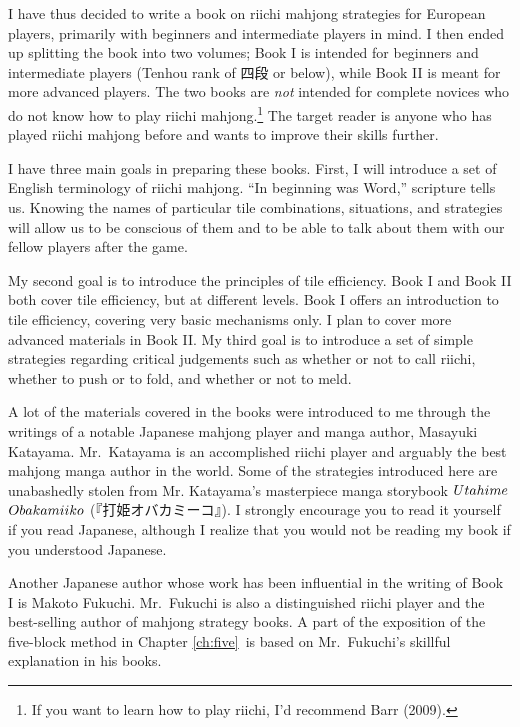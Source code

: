 \bigskip
I have thus decided to write a book on riichi mahjong strategies for European players, primarily with beginners and intermediate players in mind. I then ended up splitting the book into two volumes; Book I is intended for beginners and intermediate players ({\jap Tenhou} rank of 四段 or below), while Book II is meant for more advanced players. The two books are \emph{not} intended for complete novices who do not know how to play riichi mahjong.\footnote{If you want to learn how to play riichi, I'd recommend Barr (2009).} The target reader is anyone who has played riichi mahjong before and wants to improve their skills further. 

\bigskip
I have three main goals in preparing these books. First, I will introduce a set of English terminology of riichi mahjong. 
``In beginning was Word,'' scripture tells us. Knowing the names of particular tile combinations, situations, and strategies will allow us to be conscious of them and to be able to talk about them with our fellow players after the game. 

\bigskip
My second goal is to introduce the principles of tile efficiency. 
Book I and Book II both cover tile efficiency, but at different levels. Book I offers an introduction to tile efficiency, covering very basic mechanisms only. I plan to cover more advanced materials in Book II. 
My third goal is to introduce a set of simple strategies regarding critical judgements such as whether or not to call {\jap riichi}, whether to push or to fold, and whether or not to meld.

\bigskip
A lot of the materials covered in the books were introduced to me through the writings of a notable Japanese mahjong player and manga author, Masa\-yuki Kata\-yama. Mr.~Kata\-yama is an accomplished riichi player and arguably the best mahjong manga author in the world. Some of the strategies introduced here are unabashedly stolen from Mr. Kata\-yama's masterpiece manga storybook $Uta\-hime$ $Obaka\-miiko$ (『打姫\-オバカ\-ミーコ』). 
I strongly encourage you to read it yourself if you read Japanese, although I realize that you would not be reading my book if you understood Japanese.

\bigskip
Another Japanese author whose work has been influential in the writing of Book I is Makoto Fukuchi. Mr.~Fukuchi is also a distinguished riichi player and the best-selling author of mahjong strategy books. A part of the exposition of the five-block method in Chapter \ref{ch:five}~is based on Mr.~Fukuchi's skillful explanation in his books. 

